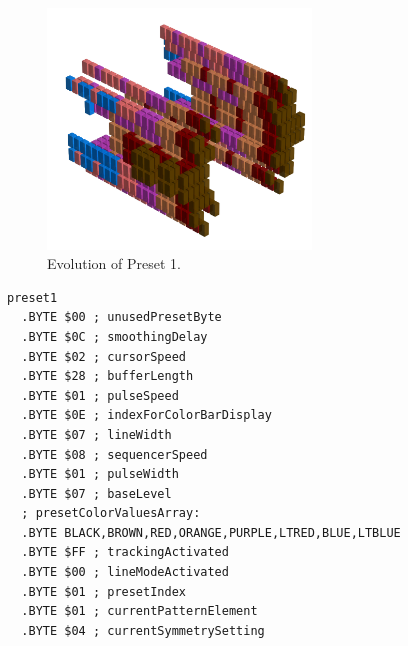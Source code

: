 \clearpage
\begin{minipage}[b]{0.48\linewidth}
\begin{figure}[H]                                                          
  \centering                                                             
  \begin{adjustbox}{width=7cm,center}                                   
  \includegraphics[width=7cm]{src/presets/pattern1-45.png}%
  \end{adjustbox}                                                        
\caption{Evolution of Preset 1.}                                           
\end{figure}                                                               
\end{minipage}
\hspace{0.1cm}
\begin{minipage}[b]{0.48\linewidth}                            
                                                                           
\begin{lstlisting}[basicstyle=\ttfamily\scriptsize,caption=Data structure for Preset 1.]
preset1
  .BYTE $00 ; unusedPresetByte
  .BYTE $0C ; smoothingDelay
  .BYTE $02 ; cursorSpeed
  .BYTE $28 ; bufferLength
  .BYTE $01 ; pulseSpeed
  .BYTE $0E ; indexForColorBarDisplay
  .BYTE $07 ; lineWidth
  .BYTE $08 ; sequencerSpeed
  .BYTE $01 ; pulseWidth
  .BYTE $07 ; baseLevel
  ; presetColorValuesArray: 
  .BYTE BLACK,BROWN,RED,ORANGE,PURPLE,LTRED,BLUE,LTBLUE
  .BYTE $FF ; trackingActivated
  .BYTE $00 ; lineModeActivated
  .BYTE $01 ; presetIndex
  .BYTE $01 ; currentPatternElement
  .BYTE $04 ; currentSymmetrySetting
\end{lstlisting}
\end{minipage}
